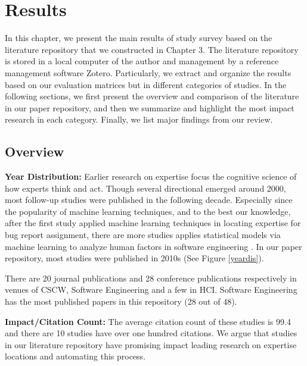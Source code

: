 \chapter{Results}

In this chapter, we present the main results of study survey based on the literature repository that we constructed in Chapter 3. The literature repository is stored in a local computer of the author and management by a reference management software Zotero. Particularly, we extract and organize the results based on our evaluation matrices but in different categories of studies. In the following sections, we first present the overview and comparison of the literature in our paper repository, and then we summarize and highlight the most impact research in each category. Finally, we list major findings from our review.

\section{Overview}

\textbf{Year Distribution:} Earlier research on expertise focus the cognitive science of how experts think and act. Though several directional \cite{mcdonald1998just, mcdonald2000expertise, mockus2002expertise} emerged around 2000, most follow-up studies were published in the following decade. Especially since the popularity of machine learning techniques, and to the best our knowledge, after the first study \cite{Anvik2006who} applied machine learning techniques in locating expertise for bug report assignment,  there are more studies applies statistical models via machine learning to analyze human factors in software engineering \cite{xu2016predicting, ye2014learning}. In our paper repository, most studies were published in 2010s (See Figure \ref{yeardis}).

There are 20 journal publications and 28 conference publications respectively in venues of CSCW, Software Engineering and a few in HCI. Software Engineering has the most published papers in this repository (28 out of 48).



\textbf{Impact/Citation Count:} The average citation count of these studies is 99.4 and there are 10 studies have over one hundred citations. We argue that studies in our literature repository have promising impact leading research on expertise locations and automating this process.

